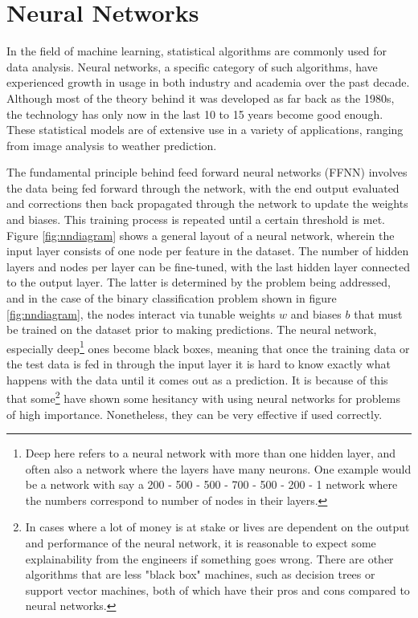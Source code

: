 \section{Neural Networks}
In the field of machine learning, statistical algorithms are commonly used for data analysis. 
Neural networks, a specific category of such algorithms, have experienced growth in 
usage in both industry and academia over the past decade. Although most of the theory behind it was 
developed as far back as the 1980s, the technology has only now in the last 10 to 15 years become good enough. 
These statistical models are of extensive use in a variety of applications, ranging from image analysis to 
weather prediction. \par 
The fundamental principle behind feed forward neural networks (FFNN) involves the 
data being fed forward through the network, with the end output evaluated and corrections then back 
propagated through the network to update the weights and biases. This training process is repeated 
until a certain threshold is met. Figure \ref{fig:nndiagram} shows a general layout of a neural 
network, wherein the input layer consists of one node per feature in the dataset. The number of 
hidden layers and nodes per layer can be fine-tuned, with the last hidden layer connected to the 
output layer. The latter is determined by the problem being addressed, and in the case of the 
binary classification problem shown in figure \ref{fig:nndiagram}, the nodes interact via 
tunable weights $w$ and biases $b$ that must be trained on the dataset prior to making predictions.
The neural network, especially deep\footnote{Deep here refers to a neural network with more than 
one hidden layer, and often also a network where the layers have many neurons. One example would be a network with say a 
200 - 500 - 500 - 700 - 500 - 200 - 1 network where the numbers correspond to number of nodes in their layers.} 
ones become black boxes, meaning that once the training data or the test data is fed in through 
the input layer it is hard to know exactly what happens with the data until it comes out as a 
prediction. It is because of this that some\footnote{In cases where a lot of money is at stake or 
lives are dependent on the output and performance of the neural network, it is reasonable to expect 
some explainability from the engineers if something goes wrong. There are other algorithms that are less 
"black box" machines, such as decision trees\cite{Chen_2016} or support vector machines\cite{cortes1995support}, 
both of which have their pros and cons compared to neural networks.} have shown some hesitancy 
with using neural networks for problems of high importance. Nonetheless, they can be very 
effective if used correctly. 

